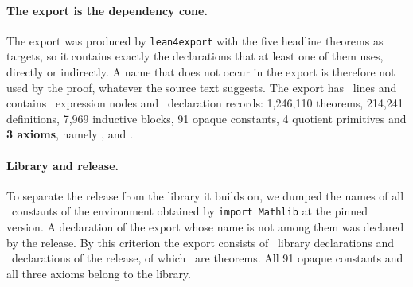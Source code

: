 \paragraph{The export is the dependency cone.}
The export was produced by \texttt{lean4export} with the five headline theorems as targets, so it contains exactly the declarations that at least one of them uses, directly or indirectly.
A name that does not occur in the export is therefore not used by the proof, whatever the source text suggests.
The export has \Nlines\ lines and contains \Nexprs\ expression nodes and \Ndecl\ declaration records:
1,246,110 theorems, 214,241 definitions, 7,969 inductive blocks, 91 opaque constants, 4 quotient primitives and \textbf{3 axioms}, namely ,  and .

\paragraph{Library and release.}
To separate the release from the library it builds on, we dumped the names of all \NmathlibNames\ constants of the environment obtained by \texttt{import Mathlib} at the pinned version.
A declaration of the export whose name is not among them was declared by the release. By this criterion the export consists of \Nlib\ library declarations and \Nproj\ declarations of the release,
of which \NprojThm\ are theorems. All 91 opaque constants and all three axioms belong to the library.

